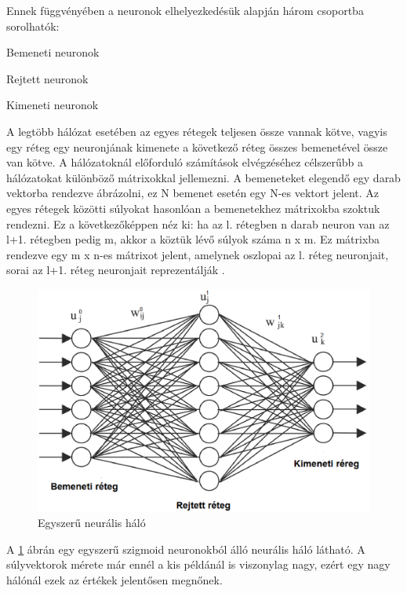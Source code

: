 Ennek függvényében a neuronok elhelyezkedésük alapján három csoportba sorolhatók:
\begin{compactenum}
	\item Bemeneti neuronok
	\item Rejtett neuronok
	\item Kimeneti neuronok
\end{compactenum}


A legtöbb hálózat esetében az egyes rétegek teljesen össze vannak kötve, vagyis egy réteg egy neuronjának kimenete a következő réteg összes bemenetével össze van kötve. A hálózatoknál előforduló számítások elvégzéséhez célszerűbb a hálózatokat különböző mátrixokkal jellemezni. A bemeneteket elegendő egy darab vektorba rendezve ábrázolni, ez N bemenet esetén egy N-es vektort jelent. Az egyes rétegek közötti súlyokat hasonlóan a bemenetekhez mátrixokba szoktuk rendezni. Ez a következőképpen néz ki: ha az l. rétegben n darab neuron van az l+1. rétegben pedig m, akkor a köztük lévő súlyok száma n x m. Ez mátrixba rendezve egy m x n-es mátrixot jelent, amelynek oszlopai az l. réteg neuronjait, sorai az l+1. réteg neuronjait reprezentálják \cite{10}. 

\begin{figure}[h]
\centering

\includegraphics[scale=0.5]{images/net.eps}
\caption{Egyszerű neurális háló}

\label{fig:net}
\end{figure}

A \ref{fig:net} ábrán egy egyszerű szigmoid neuronokból álló neurális háló látható. A súlyvektorok mérete már ennél a kis példánál is viszonylag nagy, ezért egy nagy hálónál ezek az értékek jelentősen megnőnek.


